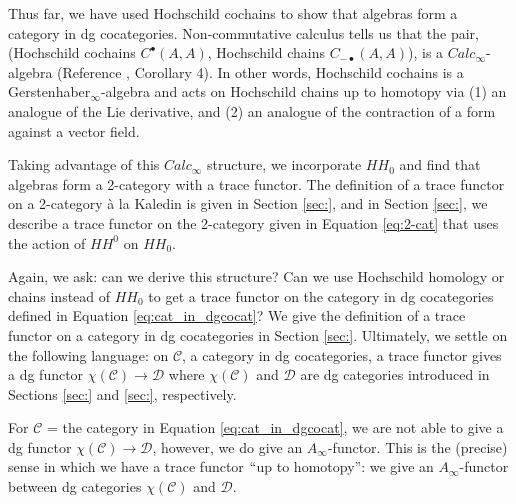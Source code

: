 Thus far, we have used Hochschild cochains to show that algebras form a category in dg cocategories. Non-commutative calculus tells us that the pair, (Hochschild cochains $C^\bullet(A,A)$, Hochschild chains $C_{-\bullet}(A,A)$), is a $Calc_\infty$-algebra (Reference \cite{DTT}, Corollary 4). In other words, Hochschild cochains is a Gerstenhaber$_\infty$-algebra and acts on Hochschild chains up to homotopy via (1) an analogue of the Lie derivative, and (2) an analogue of the contraction of a form against a vector field.

Taking advantage of this $Calc_\infty$ structure, we incorporate $HH_0$ and find that algebras form a 2-category with a trace functor. The definition of a trace functor on a 2-category \`{a} la Kaledin is given in Section \ref{sec:}, and in Section \ref{sec:}, we describe a trace functor on the 2-category given in Equation \ref{eq:2-cat} that uses the action of $HH^0$ on $HH_0$.

Again, we ask: can we derive this structure? Can we use Hochschild homology or chains instead of $HH_0$ to get a trace functor on the category in dg cocategories defined in Equation \ref{eq:cat_in_dgcocat}? We give the definition of a trace functor on a category in dg cocategories in Section \ref{sec:}. Ultimately, we settle on the following language: on $\mathcal{C}$, a category in dg cocategories, a trace functor gives a dg functor $\chi(\mathcal{C}) \to \mathcal{D}$ where $\chi(\mathcal{C})$ and $\mathcal{D}$ are dg categories introduced in Sections \ref{sec:} and \ref{sec:}, respectively. 

For $\mathcal{C}$ = the category in Equation \ref{eq:cat_in_dgcocat}, we are not able to give a dg functor $\chi(\mathcal{C}) \to \mathcal{D}$, however, we do give an $A_\infty$-functor. This is the (precise) sense in which we have a trace functor $``$up to homotopy'': we give an $A_\infty$-functor between dg categories $\chi(\mathcal{C})$ and $\mathcal{D}$.



